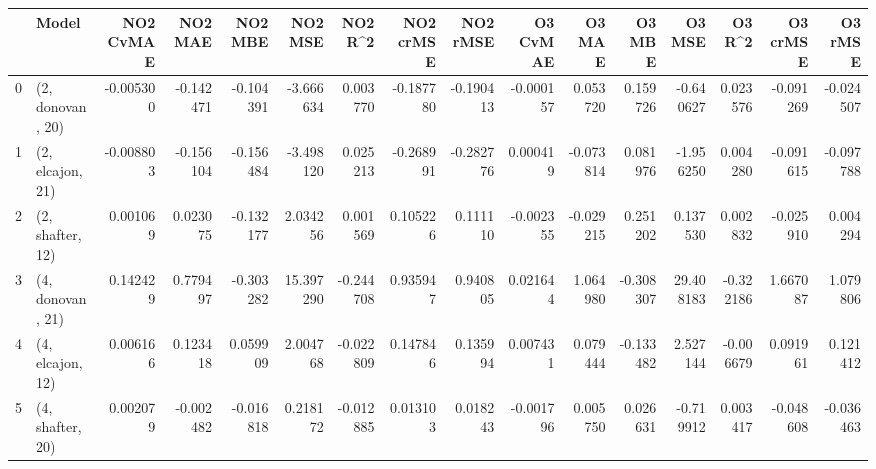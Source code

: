 \begin{tabular}{llrrrrrrrrrrrrrr}
\toprule
{} &             Model &  NO2 CvMAE &   NO2 MAE &   NO2 MBE &    NO2 MSE &   NO2 R\textasciicircum2 &  NO2 crMSE &  NO2 rMSE &  O3 CvMAE &    O3 MAE &    O3 MBE &     O3 MSE &    O3 R\textasciicircum2 &  O3 crMSE &   O3 rMSE \\
\midrule
0 &  (2, donovan, 20) &  -0.005300 & -0.142471 & -0.104391 &  -3.666634 &  0.003770 &  -0.187780 & -0.190413 & -0.000157 &  0.053720 &  0.159726 &  -0.640627 &  0.023576 & -0.091269 & -0.024507 \\
1 &  (2, elcajon, 21) &  -0.008803 & -0.156104 & -0.156484 &  -3.498120 &  0.025213 &  -0.268991 & -0.282776 &  0.000419 & -0.073814 &  0.081976 &  -1.956250 &  0.004280 & -0.091615 & -0.097788 \\
2 &  (2, shafter, 12) &   0.001069 &  0.023075 & -0.132177 &   2.034256 &  0.001569 &   0.105226 &  0.111110 & -0.002355 & -0.029215 &  0.251202 &   0.137530 &  0.002832 & -0.025910 &  0.004294 \\
3 &  (4, donovan, 21) &   0.142429 &  0.779497 & -0.303282 &  15.397290 & -0.244708 &   0.935947 &  0.940805 &  0.021644 &  1.064980 & -0.308307 &  29.408183 & -0.322186 &  1.667087 &  1.079806 \\
4 &  (4, elcajon, 12) &   0.006166 &  0.123418 &  0.059909 &   2.004768 & -0.022809 &   0.147846 &  0.135994 &  0.007431 &  0.079444 & -0.133482 &   2.527144 & -0.006679 &  0.091961 &  0.121412 \\
5 &  (4, shafter, 20) &   0.002079 & -0.002482 & -0.016818 &   0.218172 & -0.012885 &   0.013103 &  0.018243 & -0.001796 &  0.005750 &  0.026631 &  -0.719912 &  0.003417 & -0.048608 & -0.036463 \\
\bottomrule
\end{tabular}
